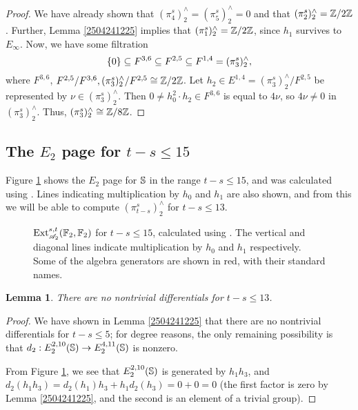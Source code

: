 \documentclass[11pt, titlepage]{article} %
\def\bb{\ensuremath\mathbb}
\def\subq{\ensuremath\subseteq}
\def\inte{\ensuremath\mathbb{Z}}
\def\A{\ensuremath{\mathscr{A}_2}}
\DeclareMathOperator{\Ext}{Ext}
\numberwithin{equation}{subsection}
\theoremstyle{plain}
\newtheorem{lemma}[theorem]{Lemma}
\theoremstyle{definition}
\begin{document}
\begin{proof}
We have already shown that \((\pi_4^s)_2^\wedge=(\pi_5^s)^\wedge_2=0\) and that \((\pi_2^s)^\wedge_2=\inte/2\inte\). Further, Lemma \ref{2504241225} implies that \((\pi_1^s)^\wedge_2=\inte/2\inte\), since \(h_1\) survives to \(E_\infty\). Now, we have some filtration
\[\{0\}\subq F^{3,6}\subq F^{2,5}\subq F^{1,4}= (\pi_3^s)^\wedge_2,\]
where \(F^{3,6}\), \(F^{2,5}/F^{3,6}, (\pi_3^s)^\wedge_2/F^{2,5}\cong \inte/2\inte\). Let \(h_2\in E^{1,4}=(\pi_3^s)^\wedge_2/F^{2,5}\) be represented by \(\nu\in (\pi_3^s)^\wedge_2\). Then \(0\neq h_0^2\cdot h_2\in F^{3,6}\) is equal to \(4\nu\), so \(4\nu \neq 0\) in \((\pi_3^s)^\wedge_2\). Thus, \((\pi_3^s)^\wedge_2\cong \inte/8\inte\).
\end{proof}

\subsection{The \(E_2\) page for \(t-s\leq 15\)}\label{2504291252}

Figure \ref{1304251243} shows the \(E_2\) page for \(\bb{S}\) in the range \(t-s\leq 15\), and was calculated using \autocite{sseq}. Lines indicating multiplication by \(h_0\) and \(h_1\) are also shown, and from this we will be able to compute \((\pi_{t-s}^s)^\wedge_2\) for \(t-s\leq 13\). 

\begin{figure}
\centering

\caption[\(\Ext_{\A}^{s,t}(\bb{F}_2, \bb{F}_2)\) for \(t-s\leq 18\).]{\(\Ext_{\A}^{s,t}(\bb{F}_2, \bb{F}_2)\) for \(t-s\leq 15\), calculated using \autocite{sseq}. The vertical and diagonal lines indicate multiplication by \(h_0\) and \(h_1\) respectively. Some of the algebra generators are shown in red, with their standard names.}
\label{1304251243}
\end{figure}

\begin{lemma}
There are no nontrivial differentials for \(t-s\leq 13\). 
\end{lemma}

\begin{proof}
We have shown in Lemma \ref{2504241225} that there are no nontrivial differentials for \(t-s\leq 5\); for degree reasons, the only remaining possibility is that \(d_2 : E_2^{2, 10}(\bb{S}) \to E_2^{4, 11}(\bb{S})\) is nonzero.

From Figure \ref{1304251243}, we see that \(E^{2, 10}_2(\bb{S})\) is generated by \(h_1h_3\), and \(d_2(h_1h_3)=d_2(h_1)h_3+h_1d_2(h_3)=0+0=0\) (the first factor is zero by Lemma \ref{2504241225}, and the second is an element of a trivial group). 
\end{proof}
\end{document}
